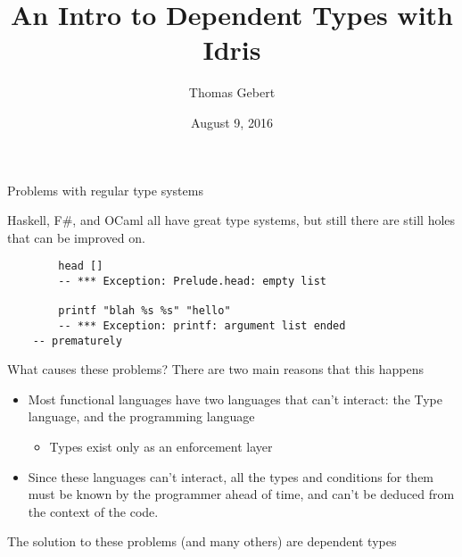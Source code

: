 \documentclass{beamer}
\title{An Intro to Dependent Types with Idris}
\subtitle{}
\author{Thomas Gebert}
\date{August 9, 2016}
\begin{document}
  \frame{\titlepage}
\begin{frame}[fragile]{Problems with regular type systems}
	
 	\transdissolve[duration=0.17]
	Haskell, F\#, and OCaml all have great type systems, but still there are still holes that can be improved on.
	\pause
	\begin{lstlisting}
		head []
		-- *** Exception: Prelude.head: empty list

		printf "blah %s %s" "hello"
		-- *** Exception: printf: argument list ended 
    -- prematurely
	\end{lstlisting}

\end{frame}
\begin{frame}{What causes these problems?}
	\transdissolve[duration=0.17]
	There are two main reasons that this happens
	\begin{itemize}
		\pause
		\item Most functional languages have two languages that can't interact: the Type language, and the programming language \begin{itemize}
			\pause
			\item Types exist only as an enforcement layer\end{itemize}
		\pause
		\item Since these languages can't interact, all the types and conditions for them must be known by the programmer ahead of time, and can't be deduced from the context of the code.
	\end{itemize}
\end{frame}
\begin{frame}
\begin{center}
 	\transdissolve[duration=0.17]
 The solution to these problems (and many others) are dependent types
\end{center}
\end{frame}
\end{document}
